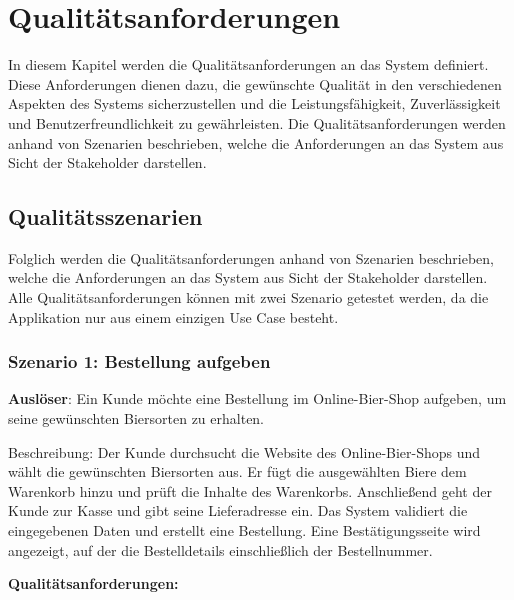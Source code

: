 
\section{Qualitätsanforderungen}
\label{sec:qualitaetsanforderungen}

In diesem Kapitel werden die Qualitätsanforderungen an das System definiert. Diese Anforderungen dienen dazu, die gewünschte Qualität in den verschiedenen Aspekten des Systems sicherzustellen und die Leistungsfähigkeit, Zuverlässigkeit und Benutzerfreundlichkeit zu gewährleisten.
Die Qualitätsanforderungen werden anhand von Szenarien beschrieben, welche die Anforderungen an das System aus Sicht der Stakeholder darstellen.

\subsection{Qualitätsszenarien}
\label{subsec:qualitaetsszenarien}
Folglich werden die Qualitätsanforderungen anhand von Szenarien beschrieben, welche die Anforderungen an das System aus Sicht der Stakeholder darstellen. Alle Qualitätsanforderungen können mit zwei Szenario getestet werden, da die Applikation nur aus einem einzigen Use Case besteht.

\subsubsection{Szenario 1: Bestellung aufgeben}
\label{subsec:szenario1}

\textbf{Auslöser}: Ein Kunde möchte eine Bestellung im Online-Bier-Shop aufgeben, um seine gewünschten Biersorten zu erhalten.

Beschreibung: Der Kunde durchsucht die Website des Online-Bier-Shops und wählt die gewünschten Biersorten aus. Er fügt die ausgewählten Biere dem Warenkorb hinzu und prüft die Inhalte des Warenkorbs. Anschließend geht der Kunde zur Kasse und gibt seine Lieferadresse ein. Das System validiert die eingegebenen Daten und erstellt eine Bestellung. Eine Bestätigungsseite wird angezeigt, auf der die Bestelldetails einschließlich der Bestellnummer.

\textbf{Qualitätsanforderungen:}

